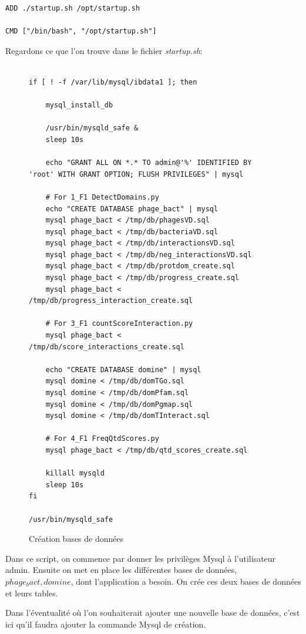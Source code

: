 \begin{lstlisting}[frame=single]
ADD ./startup.sh /opt/startup.sh

CMD ["/bin/bash", "/opt/startup.sh"]
\end{lstlisting}

\newpage
Regardons ce que l'on trouve dans le fichier \emph{startup.sh}:

\begin{figure}[H] 
\centering 
\begin{lstlisting}[frame=single]

if [ ! -f /var/lib/mysql/ibdata1 ]; then

	mysql_install_db

	/usr/bin/mysqld_safe &
	sleep 10s

	echo "GRANT ALL ON *.* TO admin@'%' IDENTIFIED BY 'root' WITH GRANT OPTION; FLUSH PRIVILEGES" | mysql

	# For 1_F1 DetectDomains.py
	echo "CREATE DATABASE phage_bact" | mysql
	mysql phage_bact < /tmp/db/phagesVD.sql
	mysql phage_bact < /tmp/db/bacteriaVD.sql
	mysql phage_bact < /tmp/db/interactionsVD.sql
	mysql phage_bact < /tmp/db/neg_interactionsVD.sql
	mysql phage_bact < /tmp/db/protdom_create.sql
	mysql phage_bact < /tmp/db/progress_create.sql
	mysql phage_bact < /tmp/db/progress_interaction_create.sql

    # For 3_F1 countScoreInteraction.py
	mysql phage_bact < /tmp/db/score_interactions_create.sql

	echo "CREATE DATABASE domine" | mysql
    mysql domine < /tmp/db/domTGo.sql
    mysql domine < /tmp/db/domPfam.sql
    mysql domine < /tmp/db/domPgmap.sql
    mysql domine < /tmp/db/domTInteract.sql

    # For 4_F1 FreqQtdScores.py
	mysql phage_bact < /tmp/db/qtd_scores_create.sql

	killall mysqld
	sleep 10s
fi

/usr/bin/mysqld_safe
\end{lstlisting}
\caption[Création bases de données]{Création bases de données}
\label{fig:createDb} 
\end{figure}

Dans ce script, on commence par donner les privilèges Mysql à l'utilisateur admin. Ensuite on met en place les différentes bases de données, \emph{$phage_bact, domine$}, dont l'application a besoin. On crée ces deux bases de données et leurs tables.

Dans l'éventualité où l'on souhaiterait ajouter une nouvelle base de données, c'est ici qu'il faudra ajouter la commande Mysql de création.

